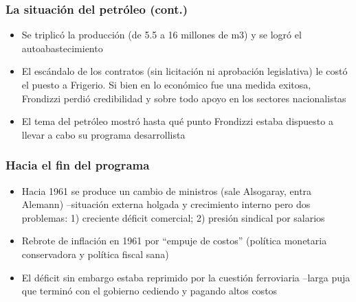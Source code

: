 \documentclass[14pt,aspectratio=169]{beamer}
\begin{document}
 \begin{frame}\frametitle{La situación del petróleo (cont.)}
                 \begin{itemize}\itemsep 5pt \medskip
                 \item Se triplicó la producción (de 5.5 a 16 millones
                   de m3) y se logró el autoabastecimiento
                   \item El escándalo de los contratos (sin licitación
                     ni aprobación legislativa) le costó el puesto a
                     Frigerio. Si bien en lo económico fue una medida
                     exitosa, Frondizzi perdió credibilidad y sobre
                     todo apoyo en los sectores nacionalistas
                     \item El tema del petróleo mostró hasta qué punto
                       Frondizzi estaba dispuesto a llevar a cabo su
                       programa desarrollista
                   \end{itemize}
               \end{frame}
               


 \begin{frame}\frametitle{Hacia el fin del programa}
                 \begin{itemize}\itemsep 5pt \medskip
                 \item Hacia 1961 se produce un cambio de ministros
                   (sale Alsogaray, entra Alemann) --situación externa
                   holgada y crecimiento interno pero dos problemas:
                   1) creciente déficit comercial; 2) presión sindical
                   por salarios
                    \item Rebrote de inflación en 1961 por ``empuje de
                      costos'' (política monetaria conservadora y
                      política fiscal sana)
                      \item El déficit sin embargo estaba reprimido
                        por la cuestión ferroviaria --larga puja que
                        terminó con el gobierno cediendo y pagando
                        altos costos
                   \end{itemize}
               \end{frame}
\end{document}
